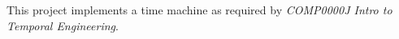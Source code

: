 This project implements a time machine as required by \textit{COMP0000J Intro to Temporal Engineering}.